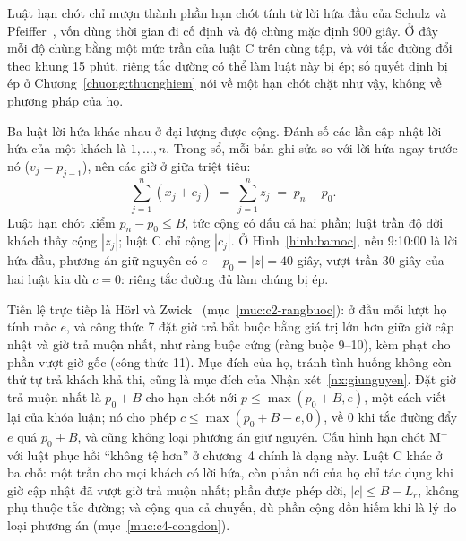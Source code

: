 Luật hạn chót chỉ mượn thành phần hạn chót tính từ lời hứa đầu của Schulz và Pfeiffer~\cite{schulz2026}, vốn
dùng thời gian đi cố định và độ chùng mặc định 900 giây. Ở đây mỗi độ chùng bằng một mức trần của luật C trên cùng
tập, và với tắc đường đổi theo khung 15 phút, riêng tắc đường có thể làm luật này bị ép; số quyết định bị ép ở
Chương~\ref{chuong:thucnghiem} nói về một hạn chót chặt như vậy, không về phương pháp của họ.

Ba luật lời hứa khác nhau ở đại lượng được cộng. Đánh số các lần cập nhật lời hứa của một khách là
$1, \ldots, n$. Trong sổ, mỗi bản ghi sửa so với lời hứa ngay trước nó ($v_j = p_{j-1}$), nên các giờ ở giữa
triệt tiêu:
\begin{equation}
\sum_{j=1}^{n} (x_j + c_j) \;=\; \sum_{j=1}^{n} z_j \;=\; p_n - p_0 .
\label{eq:dongnhat}
\end{equation}
Luật hạn chót kiểm $p_n - p_0 \le B$, tức cộng có dấu cả hai phần; luật trần độ dời khách thấy cộng $|z_j|$; luật
C chỉ cộng $|c_j|$. Ở Hình~\ref{hinh:bamoc}, nếu 9:10:00 là lời hứa đầu, phương án giữ nguyên có
$e - p_0 = |z| = 40$ giây, vượt trần 30 giây của hai luật kia dù $c = 0$: riêng tắc đường đủ làm chúng bị ép.

Tiền lệ trực tiếp là Hörl và Zwick~\cite{horl2022} (mục~\ref{muc:c2-rangbuoc}): ở đầu mỗi lượt họ tính mốc $e$,
và công thức 7 đặt giờ trả bắt buộc bằng giá trị lớn hơn giữa giờ cập nhật và giờ trả muộn nhất, như ràng buộc cứng
(ràng buộc 9--10), kèm phạt cho phần vượt giờ gốc (công thức 11). Mục đích của họ, tránh tình huống không còn thứ tự
trả khách khả thi, cũng là mục đích của Nhận xét~\ref{nx:giunguyen}. Đặt giờ trả muộn nhất là $p_0 + B$ cho hạn chót
nới $p \le \max(p_0 + B, e)$, một cách viết lại của khóa luận; nó cho phép $c \le \max(p_0 + B - e, 0)$, về 0 khi
tắc đường đẩy $e$ quá $p_0 + B$, và cũng không loại phương án giữ nguyên. Cấu hình hạn chót M$^{+}$ với luật phục
hồi ``không tệ hơn'' ở chương~4 chính là dạng này. Luật C khác ở ba chỗ:
một trần cho mọi khách có lời hứa, còn phần nới của họ chỉ tác dụng khi giờ cập nhật đã vượt giờ trả muộn nhất;
phần được phép dời, $|c| \le B - L_r$, không phụ thuộc tắc đường; và cộng qua cả chuyến, dù phần cộng dồn hiếm khi là
lý do loại phương án (mục~\ref{muc:c4-congdon}).

